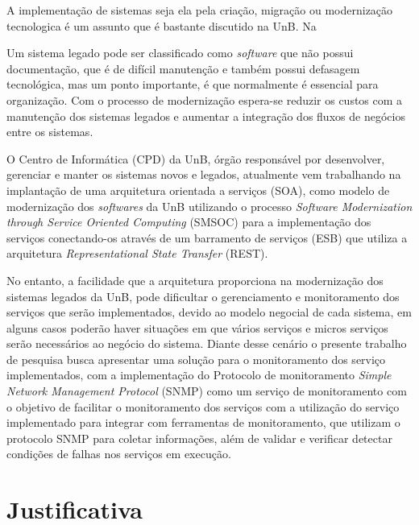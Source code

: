 \label{Introducao}

A implementação de sistemas seja ela pela criação, migração ou modernização tecnologica é um assunto que é bastante discutido na \acrfull{UnB}. Na


Um sistema legado pode ser classificado como \textit{software} que não possui documentação, que é de difícil manutenção e também possui defasagem tecnológica, mas um ponto importante, é que normalmente é essencial para organização. Com o processo de modernização espera-se reduzir os custos com a manutenção dos sistemas legados e aumentar a integração dos fluxos de negócios entre os sistemas\cite{Agilar}.

O Centro de Informática (CPD) da UnB, órgão responsável por desenvolver, gerenciar e manter os sistemas novos e legados, atualmente vem trabalhando na implantação de uma arquitetura orientada a serviços (SOA), como modelo de modernização dos \textit{softwares} da UnB utilizando o processo  \textit{Software Modernization through Service Oriented Computing} (SMSOC) para a implementação dos serviços conectando-os  através de um barramento de serviços (ESB) que utiliza a arquitetura \textit{Representational State Transfer} (REST).

No entanto, a facilidade que a arquitetura proporciona na modernização dos sistemas legados da UnB, pode dificultar o gerenciamento e monitoramento dos serviços que serão implementados, devido ao modelo negocial de cada sistema, em alguns casos poderão haver situações em que vários serviços e micros serviços serão necessários ao negócio do sistema. Diante desse cenário o presente trabalho de pesquisa busca apresentar uma solução para o monitoramento dos serviço implementados, com a implementação do Protocolo de monitoramento \textit{Simple Network Management Protocol} (SNMP) como um serviço de monitoramento com o objetivo de facilitar o monitoramento dos serviços com a utilização do serviço implementado para integrar com ferramentas de monitoramento, que utilizam o protocolo SNMP para coletar informações, além de validar e verificar detectar condições de falhas nos serviços em execução.


\section{Justificativa}

